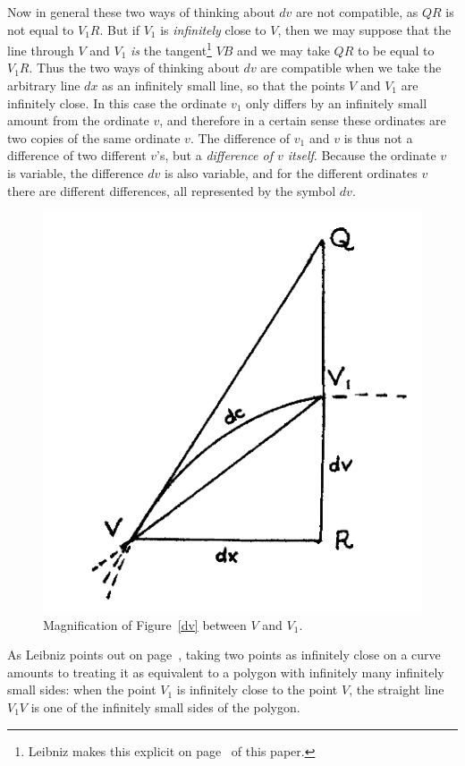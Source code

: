 \documentclass[polutonikogreek,english,twoside,openright]{article}
\begin{document}
Now in general these two ways of thinking about $dv$ are not
compatible, as $QR$ is not equal to $V_1R$.  But if $V_1$ is {\em
  infinitely} close to $V$, then we may suppose that the line through
$V$ and $V_1$ {\em is} the tangent\footnote{Leibniz makes this
  explicit on page~\pageref{taninfcl} of this paper.} $VB$ and we may
take $QR$ to be equal to $V_1R$.  Thus the two ways of thinking about
$dv$ are compatible when we take the arbitrary line $dx$ as an
infinitely small line, so that the points $V$ and $V_1$ are infinitely
close.  In this case the ordinate $v_1$ only differs by an infinitely
small amount from the ordinate $v$, and therefore in a certain sense
these ordinates are two copies of the same ordinate $v$.  The
difference of $v_1$ and $v$ is thus not a difference of two different
$v$'s, but a {\em difference of $v$ itself}.  Because the ordinate $v$
is variable, the difference $dv$ is also variable, and for the
different ordinates $v$ there are different differences, all
represented by the symbol $dv$.
\begin{figure}[h]
\begin{center}
\includegraphics[width=.5\textwidth]{fig/Figure3A}
\caption{Magnification of Figure~\ref{dv} between $V$ and $V_1$.}
\label{chartrifig}
\vspace{-10pt}
\end{center}
\end{figure}

As Leibniz points out on page~\pageref{taninfcl}, taking two points as
infinitely close on a curve amounts to treating it as equivalent to a
polygon with infinitely many infinitely small sides: when the point
$V_1$ is infinitely close to the point $V$, the straight line $V_1V$
is one of the infinitely small sides of the polygon.
\end{document}
